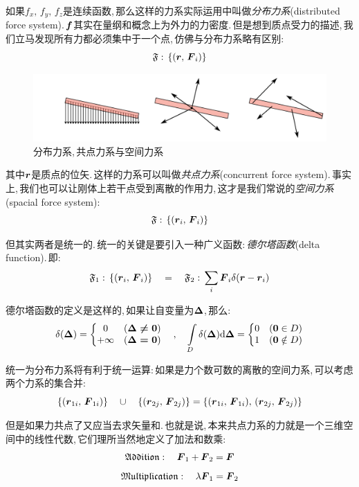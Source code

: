 如果$f_x,\,f_y,\,f_z$是连续函数,\,那么这样的力系实际运用中叫做\emph{分布力系}(distributed force system).\,$\boldsymbol{f}$其实在量纲和概念上为外力的力密度.\,但是想到质点受力的描述,\,我们立马发现所有力都必须集中于一个点,\,仿佛与分布力系略有区别:
\[\mathfrak{F}:\,\{(\boldsymbol{r},\,\boldsymbol{F}_i)\}\]

\begin{figure}[H]
\centering
\includegraphics[width=16cm]{image/6-2-8.png}
\caption{分布力系,\,共点力系与空间力系}
\end{figure}

其中$\boldsymbol{r}$是质点的位矢.\,这样的力系可以叫做\emph{共点力系}(concurrent force system).\,事实上,\,我们也可以让刚体上若干点受到离散的作用力,\,这才是我们常说的\emph{空间力系}(spacial force system):
\[\mathfrak{F}:\,\{(\boldsymbol{r}_i,\,\boldsymbol{F}_i)\}\]

但其实两者是统一的.\,统一的关键是要引入一种广义函数:\,\emph{德尔塔函数}(delta function).\,即:
\[\mathfrak{F}_1:\,\{(\boldsymbol{r}_i,\,\boldsymbol{F}_i)\}\quad =\quad \mathfrak{F}_2:\,\sum_i \boldsymbol{F}_i\delta(\boldsymbol{r}-\boldsymbol{r}_i)\]

德尔塔函数的定义是这样的,\,如果让自变量为$\boldsymbol{\Delta}$,\,那么:
\[\delta(\boldsymbol{\Delta})=\left\{\begin{matrix}0& (\boldsymbol{\Delta\neq \boldsymbol{0}}) \\ +\infty&(\boldsymbol{\Delta= \boldsymbol{0}})\end{matrix}\right.\quad,\quad \int\limits_D \delta(\boldsymbol{\Delta})\textrm{d} \boldsymbol{\Delta}=\left\{\begin{matrix}0& (\boldsymbol{0}\in D) \\ 1&(\boldsymbol{0}\notin D)\end{matrix}\right.\]

统一为分布力系将有利于统一运算:\,如果是力个数可数的离散的空间力系,\,可以考虑两个力系的集合并:
\[\{(\boldsymbol{r}_{1i},\,\boldsymbol{F}_{1i})\}\quad \cup\quad\{(\boldsymbol{r}_{2j},\,\boldsymbol{F}_{2j})\}=\{(\boldsymbol{r}_{1i},\,\boldsymbol{F}_{1i}),\,(\boldsymbol{r}_{2j},\,\boldsymbol{F}_{2j})\}\]

但是如果力共点了又应当去求矢量和.\,也就是说,\,本来共点力系的力就是一个三维空间中的线性代数,\,它们理所当然地定义了加法和数乘:
\[\mathfrak{Addition}:\quad \boldsymbol{F}_1+\boldsymbol{F}_2=\boldsymbol{F}\]
\[\mathfrak{Multiplication}:\quad \lambda \boldsymbol{F}_1=\boldsymbol{F}_2\]

